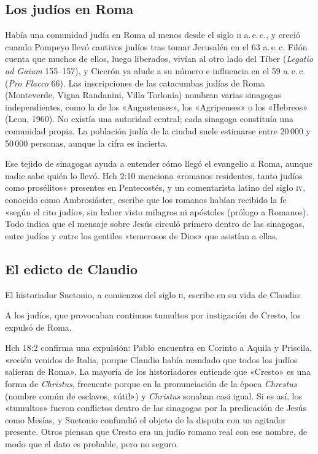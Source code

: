 \subsection{Los judíos en Roma}
Había una comunidad judía en Roma al menos desde el siglo \textsc{ii} a.\,e.\,c., y creció cuando Pompeyo llevó cautivos judíos tras tomar Jerusalén en el 63 a.\,e.\,c. Filón cuenta que muchos de ellos, luego liberados, vivían al otro lado del Tíber (\emph{Legatio ad Gaium} 155--157), y Cicerón ya alude a su número e influencia en el 59 a.\,e.\,c. (\emph{Pro Flacco} 66). Las inscripciones de las catacumbas judías de Roma (Monteverde, Vigna Randanini, Villa Torlonia) nombran varias sinagogas independientes, como la de los «Augustenses», los «Agripenses» o los «Hebreos» (Leon, 1960). No existía una autoridad central; cada sinagoga constituía una comunidad propia. La población judía de la ciudad suele estimarse entre 20\,000 y 50\,000 personas, aunque la cifra es incierta.

Ese tejido de sinagogas ayuda a entender cómo llegó el evangelio a Roma, aunque nadie sabe quién lo llevó. Hch 2:10 menciona «romanos residentes, tanto judíos como prosélitos» presentes en Pentecostés, y un comentarista latino del siglo \textsc{iv}, conocido como Ambrosiáster, escribe que los romanos habían recibido la fe «según el rito judío», sin haber visto milagros ni apóstoles (prólogo a Romanos). Todo indica que el mensaje sobre Jesús circuló primero dentro de las sinagogas, entre judíos y entre los gentiles «temerosos de Dios» que asistían a ellas.

\subsection{El edicto de Claudio}
El historiador Suetonio, a comienzos del siglo \textsc{ii}, escribe en su vida de Claudio:
\begin{cita}A los judíos, que provocaban continuos tumultos por instigación de Cresto, los expulsó de Roma.\end{cita}
Hch 18:2 confirma una expulsión: Pablo encuentra en Corinto a Aquila y Priscila, «recién venidos de Italia, porque Claudio había mandado que todos los judíos salieran de Roma». La mayoría de los historiadores entiende que «Cresto» es una forma de \emph{Christus}, frecuente porque en la pronunciación de la época \emph{Chrestus} (nombre común de esclavos, «útil») y \emph{Christus} sonaban casi igual. Si es así, los «tumultos» fueron conflictos dentro de las sinagogas por la predicación de Jesús como Mesías, y Suetonio confundió el objeto de la disputa con un agitador presente. Otros piensan que Cresto era un judío romano real con ese nombre, de modo que el dato es probable, pero no seguro.


